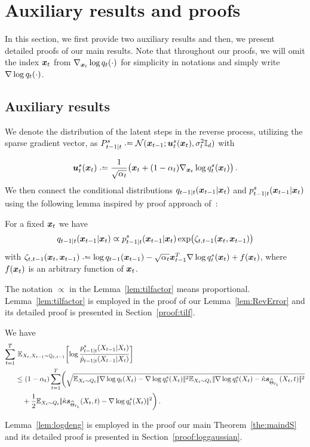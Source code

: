 
\section{Auxiliary results and proofs}
In this section,  we first provide  two auxiliary results and then, we present detailed proofs of our main results.
Note that throughout our proofs, we will omit the index  $\textcolor{black}{\boldsymbol{x}}_t$ from $\nabla_{\textcolor{black}{\boldsymbol{x}}_t}\log q_t(\cdot)$ for simplicity in notations and simply write $\nabla\log q_t(\cdot)$.  

\subsection{Auxiliary results}\label{sec:Aux}
We denote the distribution of the latent steps in the reverse process, utilizing the sparse gradient vector, as
 $\Bds_{t-1|t}\deq\mathcal{N}(\x_{t-1};\us_t(\x_t),\sigma_t^2\Identity)$ with 

\begin{equation}\label{eq:mus}
    \us_t(\x_t)\deq\frac{1}{\sqrt{\alpha_t}}\bigl(\x_t+(1-\alpha_t)\nabla_{\x_t}\log \Fdds_t(\x_t)\bigr)\,.
\end{equation}
We then connect the conditional distributions $q_{t-1|t}(\textcolor{black}{\boldsymbol{x}}_{t-1}|\textcolor{black}{\boldsymbol{x}}_t) $ and $p^s_{t-1|t}(\textcolor{black}{\boldsymbol{x}}_{t-1}|\textcolor{black}{\boldsymbol{x}}_t)$ using the following lemma inspired by proof approach of~\citet{liang2024nonN}: 
\begin{lemma}\label{lem:tilfactor}
 For a fixed $\textcolor{black}{\boldsymbol{x}}_t$ we have 
 \begin{equation*}
  q_{t-1|t}(\textcolor{black}{\boldsymbol{x}}_{t-1}|\textcolor{black}{\boldsymbol{x}}_t)  \varpropto p^s_{t-1|t}(\textcolor{black}{\boldsymbol{x}}_{t-1}|\textcolor{black}{\boldsymbol{x}}_t)\exp\bigl( \zeta_{t,t-1}(\textcolor{black}{\boldsymbol{x}}_t,\textcolor{black}{\boldsymbol{x}}_{t-1})\bigr)
\end{equation*}
with $\zeta_{t,t-1}(\x_t,\x_{t-1})\deq \log \Fdd_{t-1}(\x_{t-1})-\sqrt{\alpha_t}\x_{t-1}^T\nabla \log \Fdds_t(\x_t)+f(\x_t)$, where $f(\textcolor{black}{\boldsymbol{x}}_t)$ is an arbitrary function of $\textcolor{black}{\boldsymbol{x}}_t$.
\end{lemma}
The notation $\propto$ in the Lemma~\ref{lem:tilfactor} means proportional. 
Lemma~\ref{lem:tilfactor} is employed in the proof of our Lemma~\ref{lem:RevError} and its 
detailed proof is presented in Section~\ref{proof:tilf}.
\begin{lemma}\label{lem:logdeng}
 We have 
 \begin{align*}
     \sum_{t=1}^T&~\textcolor{black}{\mathbb{E}}_{X_t,X_{t-1}\sim \mathbb{Q}_{t,t-1}} \biggl[\log\frac{p^s_{t-1|t}(X_{t-1}|X_t)}{\hat{p}_{t-1|t}(X_{t-1}|X_t)}\biggr] \\
     &\le (1-\alpha_t) \sum_{t=1}^T \biggl(\sqrt{\textcolor{black}{\mathbb{E}}_{X_t\sim Q_t}|\!|\nabla\log q_t(X_t)-\nabla\log q^s_t(X_t)|\!|^2\textcolor{black}{\mathbb{E}}_{X_t\sim Q_t}|\!|\nabla\log q^s_t(X_t)-\hat{\kappa}\textcolor{black}{\textcolor{black}{\boldsymbol{s}}_{\textcolor{black}{\widehat{\textcolor{black}{\Theta}}_{\ell_1}}}}(X_t,t)|\!|^2}\\
    &~~~+ \frac{1}{2}\textcolor{black}{\mathbb{E}}_{X_t\sim Q_t}|\!|\hat{\kappa}\textcolor{black}{\textcolor{black}{\boldsymbol{s}}_{\textcolor{black}{\widehat{\textcolor{black}{\Theta}}_{\ell_1}}}}(X_t,t)-\nabla\log q^s_t(X_t)|\!|^2\biggr)\,.
 \end{align*}   
\end{lemma}
Lemma~\ref{lem:logdeng} is employed in the proof our main Theorem~\ref{the:maindS} and its detailed proof is presented in Section~\ref{proof:loggaussian}.
